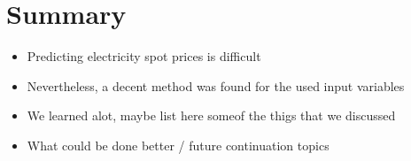 \documentclass{article}
\numberwithin{equation}{section}
\begin{document}
\section{Summary}
\begin{itemize}
	\item Predicting electricity spot prices is difficult
	\item Nevertheless, a decent method was found for the used input variables
	\item We learned alot, maybe list here someof the thigs that we discussed
	\item What could be done better / future continuation topics
\end{itemize}

\end{document}
